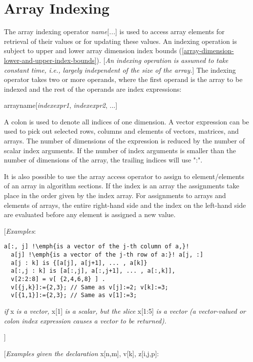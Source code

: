 \section{Array Indexing}

The array indexing operator \emph{name}{[}\emph{...}{]} is used to
access array elements for retrieval of their values or for updating
these values. An indexing operation is subject to upper and lower array
dimension index bounds (\autoref{array-dimension-lower-and-upper-index-bounds}). {[}\emph{An indexing operation
is assumed to take constant time, i.e., largely independent of the size
of the array.}{]} The indexing operator takes two or more operands,
where the first operand is the array to be indexed and the rest of the
operands are index expressions:

arrayname{[}\emph{indexexpr1}, \emph{indexexpr2}, ...{]}

A colon is used to denote all indices of one dimension. A vector
expression can be used to pick out selected rows, columns and elements
of vectors, matrices, and arrays. The number of dimensions of the
expression is reduced by the number of scalar index arguments. If the
number of index arguments is smaller than the number of dimensions of
the array, the trailing indices will use ":".

It is also possible to use the array access operator to assign to
element/elements of an array in algorithm sections. If the index is an
array the assignments take place in the order given by the index array.
For assignments to arrays and elements of arrays, the entire right-hand
side and the index on the left-hand side are evaluated before any
element is assigned a new value.

{[}\emph{Examples}:
\begin{lstlisting}[language=modelica, escapechar=!]
  a[:, j] !\emph{is a vector of the j-th column of a,}!
  a[j] !\emph{is a vector of the j-th row of a:}! a[j, :]
  a[j : k] is {[a[j], a[j+1], ... , a[k]}
  a[:,j : k] is [a[:,j], a[:,j+1], ... , a[:,k]],
  v[2:2:8] = v[ {2,4,6,8} ] .
  v[{j,k}]:={2,3}; // Same as v[j]:=2; v[k]:=3;
  v[{1,1}]:={2,3}; // Same as v[1]:=3;
\end{lstlisting}
\emph{if} x \emph{is a vector,} x{[}1{]} \emph{is a scalar, but the
slice} x{[}1:5{]} \emph{is a vector (a vector-valued or colon index
expression causes a vector to be returned).}

{]}

{[}\emph{Examples given the declaration} x{[}n,m{]}, v{[}k{]}, z{[}i,j,p{]}:

